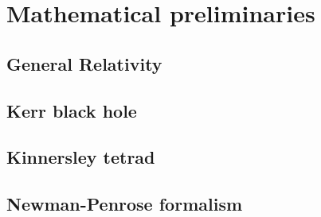 
\chapter{Mathematical preliminaries} %
\label{Chapter2}


\section{General Relativity}

\section{Kerr black hole}

\section{Kinnersley tetrad}

\section{Newman-Penrose formalism}


\cleardoublepage